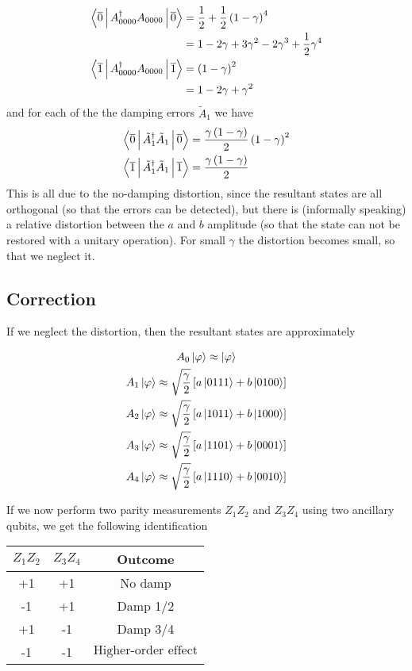 \documentclass[twoside]{article}
\begin{document}
\begin{align}
\Braket{\overline{0}|A_{0000}^{\dag}A_{0000}|\overline{0}}  &= \frac{1}{2}+\frac{1}{2}\left(1-\gamma\right)^4\\
&= 1-2\gamma +3\gamma^2-2\gamma^3+\frac{1}{2}\gamma^4\\
\Braket{\overline{1}|A_{0000}^{\dag}A_{0000}|\overline{1}} &= \left(1-\gamma\right)^2\\
 & = 1-2\gamma+\gamma^2
\end{align}
and for each of the the damping errors $\tilde{A}_{1}$ we have
\begin{align}
\Braket{\overline{0}|\tilde{A}_{1}^{\dag}\tilde{A}_{1}|\overline{0}} &= \frac{\gamma\left(1-\gamma\right)}{2}\left(1-\gamma\right)^2\\
\Braket{\overline{1}|\tilde{A}_{1}^{\dag}\tilde{A}_{1}|\overline{1}} &= \frac{\gamma\left(1-\gamma\right)}{2}
\end{align}
This is all due to the no-damping distortion, since the resultant states are all orthogonal (so that the errors can be detected), but there is (informally speaking) a relative distortion between the $a$ and $b$ amplitude (so that the state can not be restored with a unitary operation). For small $\gamma$ the distortion becomes small, so that we neglect it.

\subsection*{Correction}
If we neglect the distortion, then the resultant states are approximately

\begin{gather}
A_{0}\Ket{\varphi}\approx \Ket{\varphi}\\
A_{1}\Ket{\varphi} \approx \sqrt{\frac{\gamma}{2}}\left[a\Ket{0111}+b\Ket{0100}\right]\\
A_{2}\Ket{\varphi} \approx \sqrt{\frac{\gamma}{2}}\left[a\Ket{1011}+b\Ket{1000}\right]\\
A_{3}\Ket{\varphi} \approx \sqrt{\frac{\gamma}{2}}\left[a\Ket{1101}+b\Ket{0001}\right]\\
A_{4}\Ket{\varphi} \approx \sqrt{\frac{\gamma}{2}}\left[a\Ket{1110}+b\Ket{0010}\right]\\
\end{gather}

If we now perform two parity measurements $Z_1Z_2$ and $Z_3Z_4$ using two ancillary qubits, we get the following identification

\begin{center}
\begin{tabular}{c | c | c}
$Z_1Z_2$ & $Z_3Z_4$ & Outcome \\
\hline
+1 & +1 & \textrm{No damp}\\
-1 & +1 & \textrm{Damp 1/2}\\
+1 & -1 & \textrm{Damp 3/4}\\
-1 & -1 & $\textrm{Higher-order effect}$\\
\end{tabular}
\end{center}
\end{document}
